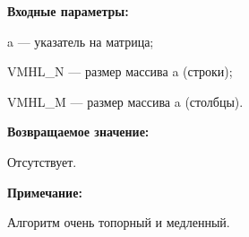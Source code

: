 \textbf{Входные параметры:}  
 
a --- указатель на матрица;
 
VMHL\_N --- размер массива a (строки);
 
VMHL\_M --- размер массива a (столбцы).

\textbf{Возвращаемое значение:}

Отсутствует.

\textbf{Примечание:}

 Алгоритм очень топорный и медленный.